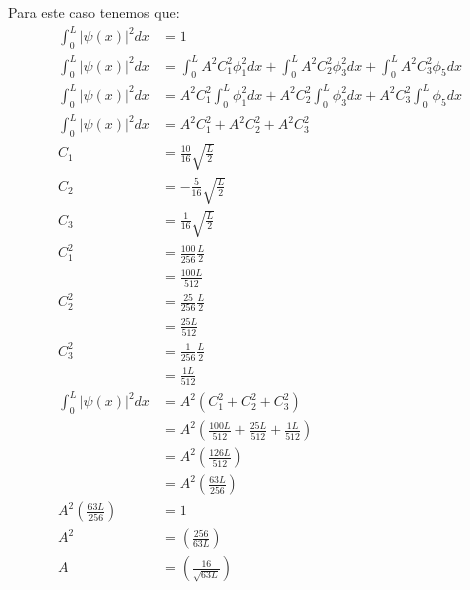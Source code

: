 \documentclass{report}
\begin{document}

\section{}

Para este caso tenemos que:
\begin{align*}
  \int_{0}^{L} \left|\psi\left(x\right)\right|^2 dx &= 1\\
  \int_{0}^{L} \left|\psi\left(x\right)\right|^2 dx &= \int_0^L A^2C_1^2\phi_1^2 dx + \int_0^L A^2C_2^2\phi_3^2 dx + \int_0^L A^2C_3^2 \phi_5 dx \\
  \int_{0}^{L} \left|\psi\left(x\right)\right|^2 dx &= A^2C_1^2\int_0^L \phi_1^2 dx + A^2C_2^2\int_0^L \phi_3^2 dx + A^2C_3^2\int_0^L  \phi_5 dx \\
  \int_{0}^{L} \left|\psi\left(x\right)\right|^2 dx &= A^2C_1^2 + A^2C_2^2 + A^2C_3^2 \\
  C_1 &= \frac{10}{16}\sqrt{\frac{L}{2}} \\
  C_2 &= -\frac{5}{16}\sqrt{\frac{L}{2}} \\
  C_3 &= \frac{1}{16}\sqrt{\frac{L}{2}} \\
  C_1^2 &= \frac{100}{256}\frac{L}{2} \\
   &= \frac{100L}{512}\\
  C_2^2 &= \frac{25}{256}{\frac{L}{2}} \\
   &= \frac{25 L}{512}\\
  C_3^2 &= \frac{1}{256}{\frac{L}{2}} \\
   &= \frac{1 L}{512}\\
  \int_{0}^{L} \left|\psi\left(x\right)\right|^2 dx &= A^2\left(C_1^2 + C_2^2 + C_3^2\right) \\
   &= A^2\left( \frac{100L}{512}+ \frac{25 L}{512} + \frac{1 L}{512}\right) \\
   &= A^2\left( \frac{126L}{512}\right) \\
   &= A^2\left( \frac{63L}{256}\right) \\
   A^2\left( \frac{63L}{256}\right) &= 1\\
   A^2 &= \left( \frac{256}{63L}\right)\\
   A &= \left( \frac{16}{\sqrt{63L}}\right)\\
\end{align*}
\end{document}
